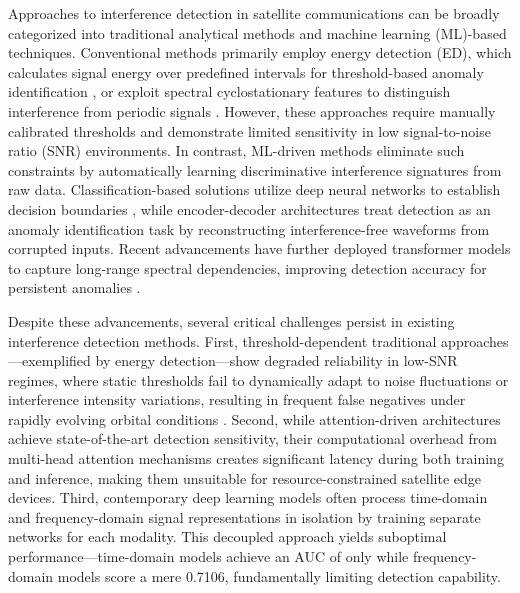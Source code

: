 \documentclass[conference]{IEEEtran}
\begin{document}
Approaches to interference detection in satellite communications can be broadly categorized into traditional analytical methods and machine learning (ML)-based techniques. Conventional methods primarily employ energy detection (ED), which calculates signal energy over predefined intervals for threshold-based anomaly identification \cite{kay2009fundamentals}, or exploit spectral cyclostationary features to distinguish interference from periodic signals \cite{experimentalCyclostationary}. However, these approaches require manually calibrated thresholds and demonstrate limited sensitivity in low signal-to-noise ratio (SNR) environments. In contrast, ML-driven methods eliminate such constraints by automatically learning discriminative interference signatures from raw data. Classification-based solutions utilize deep neural networks to establish decision boundaries \cite{pellacoSpectrumPredictionInterference2019}, while encoder-decoder architectures treat detection as an anomaly identification task by reconstructing interference-free waveforms from corrupted inputs. Recent advancements have further deployed transformer models to capture long-range spectral dependencies, improving detection accuracy for persistent anomalies \cite{saifaldawlaGenAIBasedModelsNGSO2024}.

Despite these advancements, several critical challenges persist in existing interference detection methods. First, threshold-dependent traditional approaches—exemplified by energy detection—show degraded reliability in low-SNR regimes, where static thresholds fail to dynamically adapt to noise fluctuations or interference intensity variations, resulting in frequent false negatives under rapidly evolving orbital conditions \cite{saifaldawlaGenAIBasedModelsNGSO2024}. Second, while attention-driven architectures achieve state-of-the-art detection sensitivity, their computational overhead from multi-head attention mechanisms creates significant latency during both training and inference, making them unsuitable for resource-constrained satellite edge devices. Third, contemporary deep learning models often process time-domain and frequency-domain signal representations in isolation by training separate networks for each modality. This decoupled approach yields suboptimal performance—time-domain models achieve an AUC of only  while frequency-domain models score a mere 0.7106, fundamentally limiting detection capability.
\end{document}
